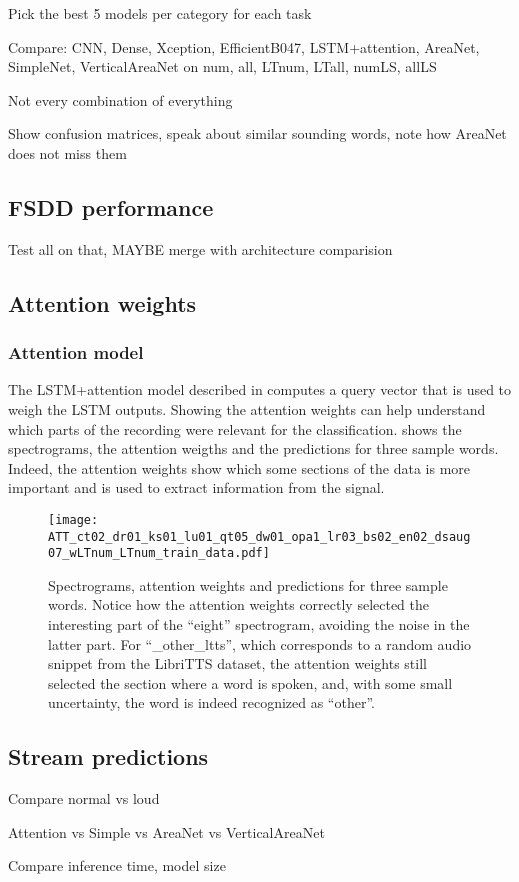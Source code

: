 Pick the best 5 models per category for each task

Compare: CNN, Dense, Xception, EfficientB047, LSTM+attention, AreaNet, SimpleNet,
VerticalAreaNet on num, all, LTnum, LTall, numLS, allLS

Not every combination of everything

Show confusion matrices, speak about similar sounding words, note how AreaNet
does not miss them

% 


\subsection{FSDD performance}

Test all on that, MAYBE merge with architecture comparision

\subsection{Attention weights}

\subsubsection{Attention model}


The LSTM+attention model described in  computes a query
vector that is used to weigh the LSTM outputs. Showing the attention weights
can help understand which parts of the recording were relevant for the
classification.
 shows the spectrograms, the attention
weigths and the predictions for three sample words.
Indeed, the attention weights show which some sections of the data is more important
and is used to extract information from the signal.

\begin{figure*}[t!]
    \centering
    \texttt{[image: ATT\_ct02\_dr01\_ks01\_lu01\_qt05\_dw01\_opa1\_lr03\_bs02\_en02\_dsaug07\_wLTnum\_LTnum\_train\_data.pdf]}
    \caption{Spectrograms, attention weights and predictions for three sample words.
    Notice how the attention weights correctly selected the interesting part of
    the ``eight'' spectrogram, avoiding the noise in the latter part.
    For ``\_other\_ltts'', which corresponds to a random audio snippet from the LibriTTS
    dataset, the attention weights still selected the section where a word is spoken,
    and, with some small uncertainty, the word is indeed recognized as ``other''.}%
    \label{fig:attention_weights_standard}
\end{figure*}

\subsection{Stream predictions}

Compare normal vs loud

Attention vs Simple vs AreaNet vs VerticalAreaNet

Compare inference time, model size
